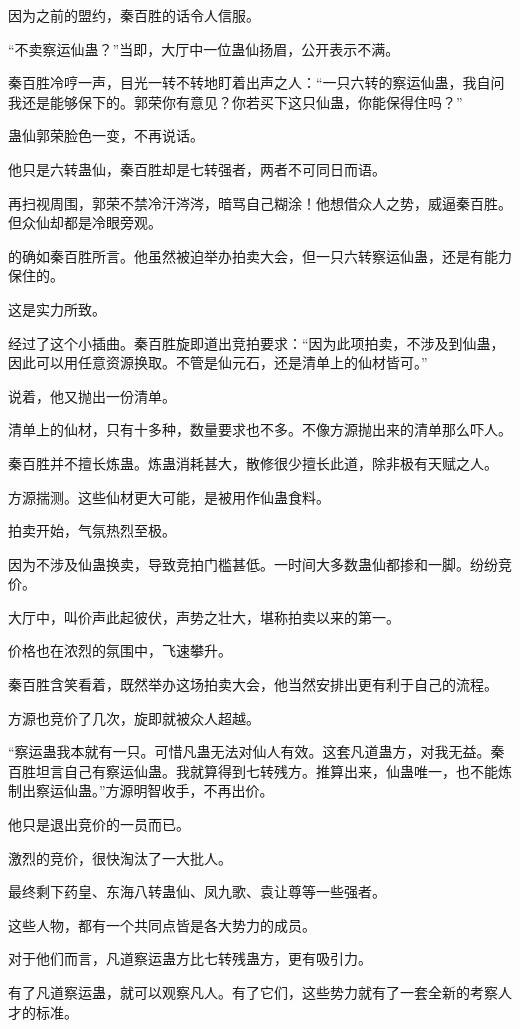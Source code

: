 \begin{this_body}
因为之前的盟约，秦百胜的话令人信服。

“不卖察运仙蛊？”当即，大厅中一位蛊仙扬眉，公开表示不满。

秦百胜冷哼一声，目光一转不转地盯着出声之人：“一只六转的察运仙蛊，我自问我还是能够保下的。郭荣你有意见？你若买下这只仙蛊，你能保得住吗？”

蛊仙郭荣脸色一变，不再说话。

他只是六转蛊仙，秦百胜却是七转强者，两者不可同日而语。

再扫视周围，郭荣不禁冷汗涔涔，暗骂自己糊涂！他想借众人之势，威逼秦百胜。但众仙却都是冷眼旁观。

的确如秦百胜所言。他虽然被迫举办拍卖大会，但一只六转察运仙蛊，还是有能力保住的。

这是实力所致。

经过了这个小插曲。秦百胜旋即道出竞拍要求：“因为此项拍卖，不涉及到仙蛊，因此可以用任意资源换取。不管是仙元石，还是清单上的仙材皆可。”

说着，他又抛出一份清单。

清单上的仙材，只有十多种，数量要求也不多。不像方源抛出来的清单那么吓人。

秦百胜并不擅长炼蛊。炼蛊消耗甚大，散修很少擅长此道，除非极有天赋之人。

方源揣测。这些仙材更大可能，是被用作仙蛊食料。

拍卖开始，气氛热烈至极。

因为不涉及仙蛊换卖，导致竞拍门槛甚低。一时间大多数蛊仙都掺和一脚。纷纷竞价。

大厅中，叫价声此起彼伏，声势之壮大，堪称拍卖以来的第一。

价格也在浓烈的氛围中，飞速攀升。

秦百胜含笑看着，既然举办这场拍卖大会，他当然安排出更有利于自己的流程。

方源也竞价了几次，旋即就被众人超越。

“察运蛊我本就有一只。可惜凡蛊无法对仙人有效。这套凡道蛊方，对我无益。秦百胜坦言自己有察运仙蛊。我就算得到七转残方。推算出来，仙蛊唯一，也不能炼制出察运仙蛊。”方源明智收手，不再出价。

他只是退出竞价的一员而已。

激烈的竞价，很快淘汰了一大批人。

最终剩下药皇、东海八转蛊仙、凤九歌、袁让尊等一些强者。

这些人物，都有一个共同点皆是各大势力的成员。

对于他们而言，凡道察运蛊方比七转残蛊方，更有吸引力。

有了凡道察运蛊，就可以观察凡人。有了它们，这些势力就有了一套全新的考察人才的标准。


\end{this_body}
